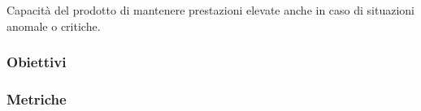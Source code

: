 Capacità del prodotto di mantenere prestazioni elevate anche in caso di situazioni anomale o
critiche.

\subsubsection{Obiettivi}


\subsubsection{Metriche}
